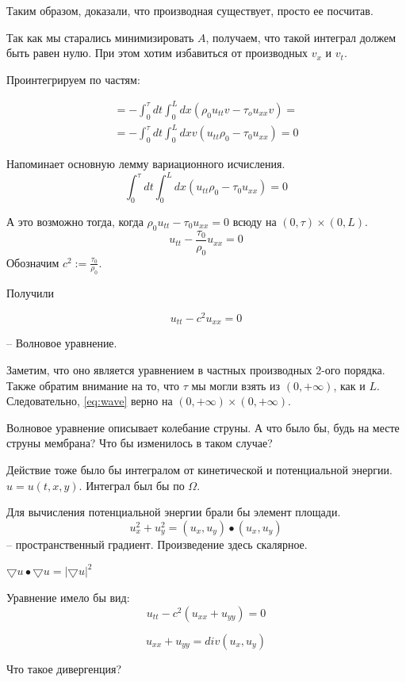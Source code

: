 \documentclass[12pt]{report}
\begin{document}
Таким образом, доказали, что производная существует, просто ее посчитав. 

Так как мы старались минимизировать $A$, получаем, что такой интеграл должем быть равен нулю. При этом хотим избавиться от производных $v_x$ и $v_t$.

Проинтегрируем по частям: 

$$
\begin{gathered}
    = - \int^{\tau}_{0}{dt \int^{L}_{0}{dx(\rho_0 u_{tt} v - \tau_o u_{xx}v)}} =
    \\
    = - \int^{\tau}_{0}{dt \int^{L}_{0}{dx v (u_{tt}\rho_0 - \tau_0 u_{xx})}} = 0 
\end{gathered}
$$

Напоминает основную лемму вариационного исчисления.
$$
    \int_{0}^{\tau}{dt \int^{L}_{0}{dx(u_{tt} \rho_0 - \tau_0 u_{xx})}} = 0
$$

А это возможно тогда, когда $\rho_0 u_{tt} - \tau_0 u_{xx} = 0$ всюду на $(0, \tau) \times (0, L)$.
$$u_{tt} - \frac{\tau_0}{\rho_0}u_{xx} = 0$$Обозначим $c^2 := \frac{\tau_0}{\rho_0}$.

Получили 

\begin{equation} \label{eq:wave}
    u_{tt} - c ^ 2 u_{xx} = 0
\end{equation}

-- Волновое уравнение. 

Заметим, что оно является уравнением в частных производных 2-ого порядка. Также обратим внимание на то, что $\tau$ мы могли взять из $(0, +\infty)$, как и $L$. Следовательно, \eqref{eq:wave} верно на $(0, +\infty) \times (0, +\infty)$.

Волновое уравнение описывает колебание струны. А что было бы, будь на месте струны мембрана? Что бы изменилось в таком случае? 

Действие тоже было бы интегралом от кинетической и потенциальной энергии. $u = u(t,x,y)$. Интеграл был бы по $\Omega$.

Для вычисления потенциальной энергии брали бы элемент площади. 
$$
    u_x^2 + u_y^2 = (u_x, u_y) \bullet (u_x, u_y)
$$
-- пространственный градиент. Произведение здесь скалярное. 

$\bigtriangledown u \bullet \bigtriangledown u = |\bigtriangledown u| ^ 2$

Уравнение имело бы вид: 
$$u_{tt} - c ^ 2(u_{xx} + u_{yy}) = 0$$

$$u_{xx} + u_{yy} = div(u_x, u_y)$$

Что такое дивергенция? 
\end{document}
